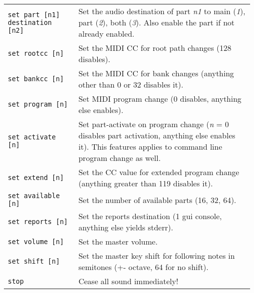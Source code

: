 \begin{table}[H]
\begin{tabular}{l l}
         \texttt{set part [n1] destination [n2]} &
            Set the audio destination of part \textsl{n1}
            to main (\textsl{1}), part (\textsl{2}), both (\textsl{3}).
            Also enable the part if not already enabled. \\

         \texttt{set rootcc [n]} &
            Set the MIDI CC for root path changes (128 disables). \\

         \texttt{set bankcc [n]} &
            Set the MIDI CC for bank changes (anything other than 0 or 32
            disables it). \\

         \texttt{set program [n]} &
            Set MIDI program change (0 disables, anything else enables). \\

         \texttt{set activate [n]} &
            Set part-activate on program change (\textsl{n} = 0 disables
            part activation, anything else enables it). This features
            applies to command line program change as well. \\

         \texttt{set extend [n]} &
            Set the CC value for extended program change (anything greater
            than 119 disables it). \\

         \texttt{set available [n]} &
            Set the number of available parts (16, 32, 64). \\

         \texttt{set reports [n]} &
            Set the reports destination (1 gui console, anything else yields
            stderr). \\

         \texttt{set volume [n]} &
            Set the master volume. \\

         \texttt{set shift [n]} &
            Set the master key shift for following notes in semitones (+-
            octave, 64 for no shift). \\

         \texttt{stop} &
            Cease all sound immediately! \\

%
%

      \end{tabular}
   \end{table}

